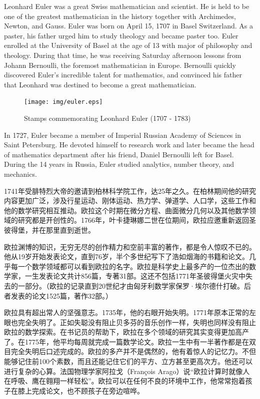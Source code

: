 \documentclass{article}
\begin{document}
\vspace{5mm}


Leonhard Euler was a great Swiss mathematician and scientist. He is held to be one of the greatest mathematician in the history together with Archimedes, Newton, and Gauss. Euler was born on April 15, 1707 in Basel Switzerland. As a paster, his father urged him to study theology and became paster too. Euler enrolled at the University of Basel at the age of 13 with major of philosophy and theology. During that time, he was receiving Saturday afternoon lessons from Johann Bernoulli, the foremost mathematician in Europe. Bernoulli quickly discovered Euler's incredible talent for mathematics, and convinced his father that Leonhard was destined to become a great mathematician.

\begin{figure}[htbp]
 \centering
 \texttt{[image: img/euler.eps]}
 \captionsetup{labelformat=empty}
 \caption{Stamps commemorating Leonhard Euler (1707 - 1783)}
 \label{fig:Leonhard-Euler}
\end{figure}

In 1727, Euler became a member of Imperial Russian Academy of Sciences in Saint Petersburg. He devoted himself to research work and later became the head of mathematics department after his friend, Daniel Bernoulli left for Basel. During the 14 years in Russia, Euler studied analytics, number theory, and mechanics.

1741年受腓特烈大帝的邀请到柏林科学院工作，达25年之久。在柏林期间他的研究内容更加广泛，涉及行星运动、刚体运动、热力学、弹道学、人口学，这些工作和他的数学研究相互推动。欧拉这个时期在微分方程、曲面微分几何以及其他数学领域的研究都是开创性的。1766年，叶卡捷琳娜二世在位期间，欧拉应邀重新返回圣彼得堡，并在那里直到逝世。

欧拉渊博的知识，无穷无尽的创作精力和空前丰富的著作，都是令人惊叹不已的。他从19岁开始发表论文，直到76岁，半个多世纪写下了浩如烟海的书籍和论文。几乎每一个数学领域都可以看到欧拉的名字。欧拉是科学史上最多产的一位杰出的数学家，一生发表论文共计856篇，专著31部。这还不包括1771年圣彼得堡火灾中失去的一部分。（欧拉的记录直到20世纪才由匈牙利数学家保罗·埃尔德什打破。后者发表的论文1525篇，著作32部。\cite{Wiki-Euler}）

欧拉具有超出常人的坚强意志。1735年，他的右眼开始失明。1771年原本正常的左眼也完全失明了。正如失聪没有阻止贝多芬的音乐创作一样，失明也同样没有阻止欧拉的数学探索\cite{HanXueTao2009}。在书记员的帮助下，欧拉在多个领域的研究其实变得更加高产了。在1775年，他平均每周就完成一篇数学论文。欧拉一生中有一半著作都是在双目完全失明后口述完成的。欧拉的多产并不是偶然的，他有着惊人的记忆力。不但能够记住前100个素数，而且还能记住它们的平方、立方甚至更高次方。他还可以进行复杂的心算。法国物理学家阿拉戈（François Arago）说“欧拉计算时就像人在呼吸、鹰在翱翔一样轻松”。欧拉可以在任何不良的环境中工作，他常常抱着孩子在膝上完成论文，也不顾孩子在旁边喧哗。
\end{document}
